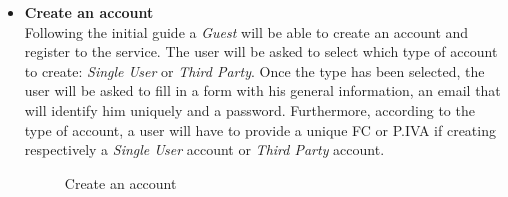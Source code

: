 \documentclass[titlepage]{article}
\begin{document}
\begin{itemize}
\begin{itemize}
				\item{\bf Create an account}\\
				Following the initial guide a {\it Guest} will be able to create an account and register to the service. The user will be asked to select which type of account to create: {\it Single User} or {\it Third Party}. Once the type has been selected, the user will be asked to fill in a form with his general information, an email that will identify him uniquely and a password. Furthermore, according to the type of account, a user will have to provide a unique FC or P.IVA if creating respectively a {\it Single User} account or {\it Third Party} account.\\
				
\begin{figure}[H]%
    \centering
    \qquad
    \caption{Create an account}%
    \label{fig:CreateAccount}%
\end{figure}


\end{itemize}
\end{itemize}
\end{document}
